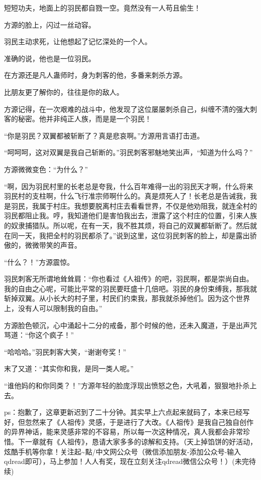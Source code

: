 \begin{this_body}
短短功夫，地面上的羽民都自戮一空。竟然没有一人苟且偷生！

方源的脸上，闪过一丝动容。

羽民主动求死，让他想起了记忆深处的一个人。

准确的说，他也是一位羽民。

在方源还是凡人蛊师时，身为刺客的他，多番来刺杀方源。

比朋友更了解你的，往往是你的敌人。

方源记得，在一次艰难的战斗中，他发现了这位屡屡刺杀自己，纠缠不清的强大刺客的秘密。他并非纯正人族，而是是一个羽民！

“你是羽民？双翼都被斩断了？真是悲哀啊。”方源用言语打击道。

“呵呵呵，这对双翼是我自己斩断的。”羽民刺客邪魅地笑出声，“知道为什么吗？”

方源微微变色：“为什么？”

“啊，因为羽民村里的长老总是夸我，什么百年难得一出的羽民天才啊，什么将来羽民村的支柱啊，什么飞行准宗师啊什么的。真是烦死人了！长老总是告诫我，我是羽民，我属于村庄。我想要脱离村庄去看看世界，不仅是他劝阻我，就连全村的羽民都阻止我。哼，我知道他们是害怕我出去，泄露了这个村庄的位置，引来人族的奴隶捕猎队。所以呢，在有一天，我不胜其烦，将自己的双翼都斩断了。然后就在同一天，我把全村的羽民都杀了。”说到这里，这位羽民刺客的脸上，却是露出骄傲的，微微带笑的声音。

“什么？！”方源震惊。

羽民刺客无所谓地耸耸肩：“你也看过《人祖传》的吧，羽民啊，都是崇尚自由。我的自由之心呢，可能比平常的羽民要旺盛十几倍吧。羽民的身份束缚我，那我就斩掉双翼。从小长大的村子里，村民们约束我，那我就杀掉他们。因为这个世界上，没有人可以限制我的自由。”

方源脸色顿沉，心中涌起十二分的戒备，那个时候的他，还未入魔道，于是出声咒骂道：“你这个疯子！”

“哈哈哈。”羽民刺客大笑，“谢谢夸奖！”

末了又道：“其实你和我，是同一类人呢。”

“谁他妈的和你同类？！”方源年轻的脸庞浮现出愤怒之色，大吼着，狠狠地扑杀上去。

ps：抱歉了，这章更新迟到了二十分钟。其实早上六点起来就码了，本来已经写好，但忽然来了《人祖传》灵感，于是进行了大改。《人祖传》是我自己独自创作的异界神话，能来灵感非常的不容易，所以每一次这种情况，真人我都会非常珍惜。下一章就有《人祖传》，恳请大家多多的谅解和支持。（天上掉馅饼的好活动，炫酷手机等你拿！关注起\~{}點/中文网公众号（微信添加朋友-添加公众号-输入qdread即可），马上参加！人人有奖，现在立刻关注qdread微信公众号！）(未完待续)

\end{this_body}

